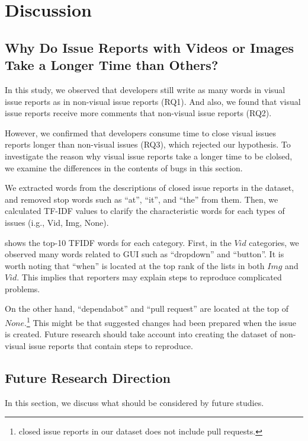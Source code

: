 \section{Discussion}
%
\subsection{Why Do Issue Reports with Videos or Images Take a Longer Time than Others?}
In this study, we observed that developers still write as many words in visual issue reports as in non-visual issue reports (RQ1). And also, we found that visual issue reports receive more comments that non-visual issue reports (RQ2). 

However, we confirmed that developers consume time to close visual issues reports longer than non-visual issues (RQ3), which rejected our hypothesis. To investigate the reason why visual issue reports take a longer time to be clolsed, we examine the differences in the contents of bugs in this section. 

We extracted words from the descriptions of closed issue reports in the dataset, and  removed stop words such as ``at'', ``it'', and ``the'' from them. Then, we calculated TF-IDF values to clarify the characteristic words for each types of issues (i.g., Vid, Img, None). 

 shows the top-10 TFIDF words for each category.
First, in the $Vid$ categories, we observed many words  related to GUI such as ``dropdown'' and ``button''. It is worth noting that ``when'' is located at the top rank of the lists in both $Img$ and $Vid$. This implies that reporters may explain steps to reproduce complicated problems. 

On the other hand, ``dependabot'' and ``pull request'' are located at the top of  $None$.\footnote{closed issue reports in our dataset does not include pull requests.} This might be that suggested changes had been prepared when the issue is created. Future research should take account into creating the dataset of non-visual issue reports that contain steps to reproduce. 



\subsection{Future Research Direction}
In this section, we discuss what should be considered by future studies. 

